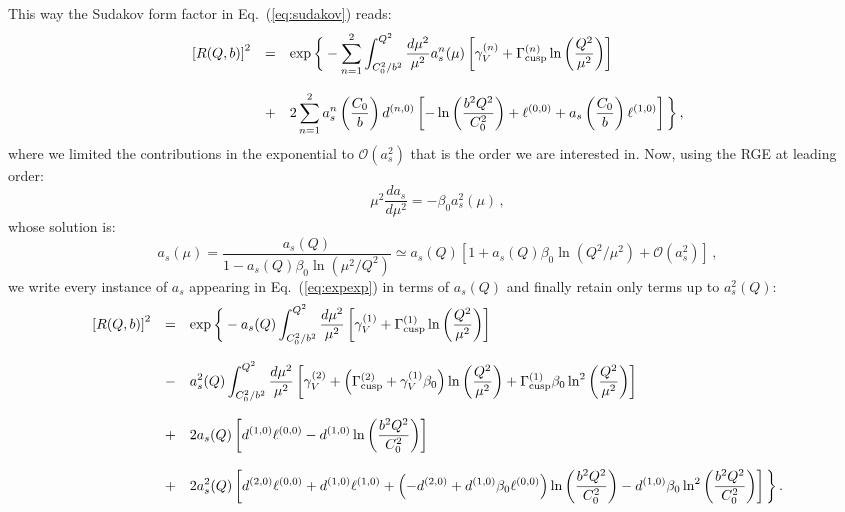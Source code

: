 \documentclass[10pt,a4paper]{article}
\begin{document}
This way the Sudakov form factor in Eq.~(\ref{eq:sudakov}) reads:
\begin{equation}\label{eq:expexp}
\begin{array}{rcl}
  \displaystyle \left[R(Q,b)\right]^2&=&\displaystyle \exp\bigg\{-\sum_{n=1}^2\int_{C_0^2/b^2}^{Q^2}\frac{d\mu^2}{\mu^2}a_s^n(\mu)\left[\gamma_V^{(n)}+\Gamma_{\rm
                                         cusp}^{(n)}\ln\left(\frac{Q^2}{\mu^2}\right)\right]\\
  \\
                                     &+&\displaystyle  2
                                         \sum_{n=1}^2a_s^{n}\left(\frac{C_0}{b}\right)d^{(n,0)}\left[-\ln\left(\frac{b^2Q^2}{C_0^2}\right)+\ell^{(0,0)}+a_s\left(\frac{C_0}{b}\right)\ell^{(1,0)}\right]\bigg\}\,,
\end{array}
\end{equation}
where we limited the contributions in the exponential to
$\mathcal{O}(a_s^2)$ that is the order we are interested in. Now,
using the RGE at leading order:
\begin{equation}
\mu^2\frac{da_s}{d\mu^2}=-\beta_0a_s^2(\mu)\,,
\end{equation}
whose solution is:
\begin{equation}
a_s(\mu) = \frac{a_s(Q)}{1-a_s(Q)\beta_0\ln(\mu^2/Q^2)}\simeq a_s(Q)\left[1+a_s(Q)\beta_0\ln(Q^2/\mu^2)+\mathcal{O}(a_s^2)\right]\,,
\end{equation}
we write every instance of $a_s$ appearing in Eq.~(\ref{eq:expexp}) in
terms of $a_s(Q)$ and finally retain only terms up to $a_s^2(Q)$:
\begin{equation}\label{eq:sudint}
\begin{array}{rcl}
  \displaystyle \left[R(Q,b)\right]^2&=&\displaystyle \exp\bigg\{-a_s(Q)\int_{C_0^2/b^2}^{Q^2}\frac{d\mu^2}{\mu^2}\left[\gamma_V^{(1)}+\Gamma_{\rm
                                         cusp}^{(1)}\ln\left(\frac{Q^2}{\mu^2}\right)\right]\\
  \\
  &-&\displaystyle a_s^2(Q) \int_{C_0^2/b^2}^{Q^2}\frac{d\mu^2}{\mu^2}\left[\gamma_V^{(2)}+\left(\Gamma_{\rm
                                         cusp}^{(2)}+\gamma_V^{(1)}\beta_0 \right)\ln\left(\frac{Q^2}{\mu^2}\right)+\Gamma_{\rm
                                         cusp}^{(1)}\beta_0\ln^2\left(\frac{Q^2}{\mu^2}\right)\right]\\
  \\
                                     &+&\displaystyle  2
                                         a_s(Q) \left[d^{(1,0)}\ell^{(0,0)}-d^{(1,0)}\ln\left(\frac{b^2Q^2}{C_0^2}\right)\right]\\
  \\ &+&\displaystyle  2 a_s^{2}(Q) \left[d^{(2,0)}\ell^{(0,0)} +
         d^{(1,0)}\ell^{(1,0)}+\left(-d^{(2,0)}+d^{(1,0)}\beta_0
         \ell^{(0,0)}\right)\ln\left(\frac{b^2Q^2}{C_0^2}\right)-d^{(1,0)}\beta_0
         \ln^2\left(\frac{b^2Q^2}{C_0^2}\right) \right]\bigg\}\,.
\end{array}
\end{equation}
\end{document}
